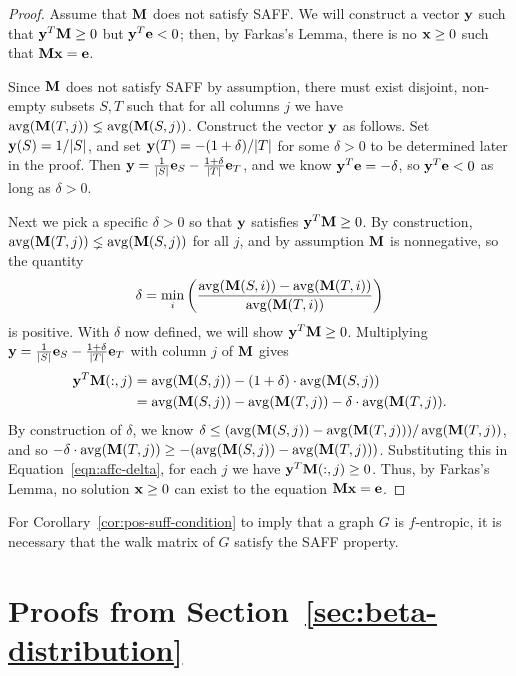 \begin{proof}
  Assume that $\textbf{M}$ does not satisfy SAFF. We will construct a vector $\textbf{y}$ such that $\textbf{y}^T\textbf{M} \geq 0$ but $\textbf{y}^T\textbf{e} < 0$; then, by Farkas's Lemma, there is no $\textbf{x} \geq 0$ such that $\textbf{M}\textbf{x} = \textbf{e}$.

  Since $\textbf{M}$ does not satisfy SAFF by assumption, there must exist disjoint, non-empty subsets $S,T$ such that for all columns $j$ we have $\operatorname*{avg}(\textbf{M}(T,j)) \lneq \operatorname*{avg}(\textbf{M}(S,j))$.
  Construct the vector $\textbf{y}$ as follows. Set $\textbf{y}(S) = 1/|S|$, and set $\textbf{y}(T) = -(1+\delta)/|T|$ for some $\delta > 0$ to be determined later in the proof.
  Then $\textbf{y} = \tfrac{1}{|S|}\textbf{e}_S - \tfrac{1+\delta}{|T|}\textbf{e}_T$, and we know
  $\textbf{y}^T\textbf{e} = -\delta$, so $\textbf{y}^T\textbf{e} < 0$
  as long as $\delta > 0$.

  Next we pick a specific $\delta > 0$ so that $\textbf{y}$ satisfies $\textbf{y}^T\textbf{M} \geq 0$.
  By construction, $\operatorname*{avg}(\textbf{M}(T,j)) \lneq \operatorname*{avg}(\textbf{M}(S,j))$ for all $j$, and by assumption $\textbf{M}$ is nonnegative, so the quantity
  \begin{equation}
    \delta = \displaystyle\min_i \left(  \frac{\operatorname*{avg}(\textbf{M}(S,i)) - \operatorname*{avg}(\textbf{M}(T,i))}{\operatorname*{avg}(\textbf{M}(T,i))}   \right)
  \end{equation}
  is positive.
  With $\delta$ now defined, we will show $\textbf{y}^T\textbf{M} \geq 0$.
  Multiplying $\textbf{y} = \tfrac{1}{|S|}\textbf{e}_S - \tfrac{1+\delta}{|T|}\textbf{e}_T$ with column $j$ of $\textbf{M}$ gives
  \begin{align}
    \textbf{y}^T\textbf{M}(:,j) &= \operatorname*{avg}(\textbf{M}(S,j)) - (1+\delta)\cdot \operatorname*{avg}(\textbf{M}(S,j)) \nonumber \\
                  &= \operatorname*{avg}(\textbf{M}(S,j)) - \operatorname*{avg}(\textbf{M}(T,j)) - \delta \cdot \operatorname*{avg}(\textbf{M}(T,j)). \label{eqn:affc-delta}
  \end{align}
  By construction of $\delta$, we know
  $\delta \leq ( \operatorname*{avg}(\textbf{M}(S,j)) - \operatorname*{avg}(\textbf{M}(T,j)) ) / \operatorname*{avg}(\textbf{M}(T,j)) $,
  and so $-\delta \cdot \operatorname*{avg}(\textbf{M}(T,j)) \geq - (\operatorname*{avg}(\textbf{M}(S,j)) - \operatorname*{avg}(\textbf{M}(T,j)))$.
  Substituting this in Equation~\eqref{eqn:affc-delta}, for each $j$ we have ${\textbf{y}^T\textbf{M}(:,j)\geq0}$.
  Thus, by Farkas's Lemma, no solution $\textbf{x} \geq 0 $ can exist to the equation $\textbf{M}\textbf{x} = \textbf{e}$.
\end{proof}

For Corollary~\ref{cor:pos-suff-condition} to imply that a graph $G$ is $f$-entropic, it is necessary that the walk matrix of $G$ satisfy the SAFF property.


\section{Proofs from Section~\ref{sec:beta-distribution}}


